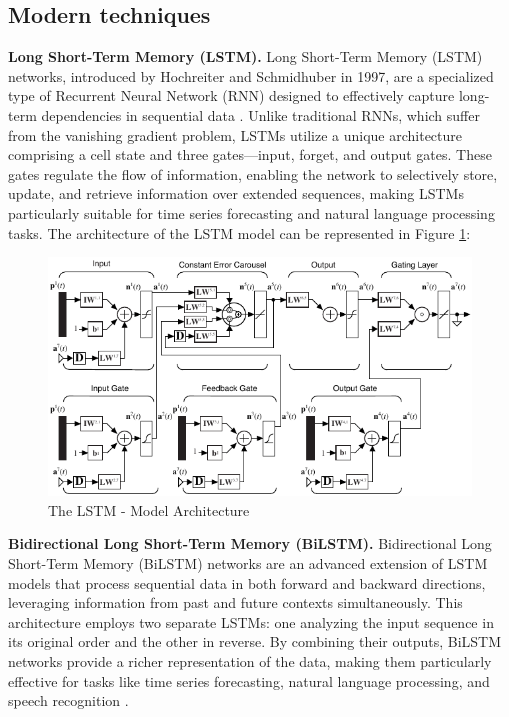 \documentclass{scrartcl}
\begin{document}
\subsection{Modern techniques}
\textbf{Long Short-Term Memory (LSTM).}
Long Short-Term Memory (LSTM) networks, introduced by Hochreiter and Schmidhuber in 1997, are a specialized type of Recurrent Neural Network (RNN) \cite{medsker2001recurrent} designed to effectively capture long-term dependencies in sequential data \cite{hochreiter1997lstm}. Unlike traditional RNNs, which suffer from the vanishing gradient problem, LSTMs utilize a unique architecture comprising a cell state and three gates—input, forget, and output gates. These gates regulate the flow of information, enabling the network to selectively store, update, and retrieve information over extended sequences, making LSTMs particularly suitable for time series forecasting and natural language processing tasks. The architecture of the LSTM model can be represented in Figure \ref{fig:lstm}:
\begin{figure}[H]
	\begin{center}
		\includegraphics[scale=0.99]{Latex_report/fig/lstm.pdf}
	\end{center}
	\caption{The LSTM - Model Architecture
    \cite{nlp_lecture}}
	\label{fig:lstm}
\end{figure}

\textbf{Bidirectional Long Short-Term Memory (BiLSTM).}
Bidirectional Long Short-Term Memory (BiLSTM) networks are an advanced extension of LSTM models that process sequential data in both forward and backward directions, leveraging information from past and future contexts simultaneously. This architecture employs two separate LSTMs: one analyzing the input sequence in its original order and the other in reverse. By combining their outputs, BiLSTM networks provide a richer representation of the data, making them particularly effective for tasks like time series forecasting, natural language processing, and speech recognition \cite{graves2005framewise}.
\end{document}
